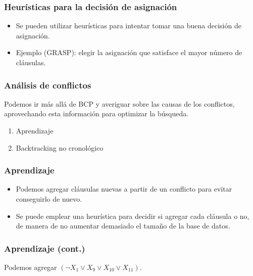 \documentclass{beamer}
\begin{document}
\frame
{
  \frametitle{Heurísticas para la decisión de asignación}

  \begin{itemize}
   \item Se pueden utilizar heurísticas para intentar tomar una buena decisión de asignación.
   \item Ejemplo (GRASP): elegir la asignación que satisface el mayor número de cláusulas.
  \end{itemize}
}

\frame
{
  \frametitle{Análisis de conflictos}

  Podemos ir más allá de BCP y averiguar sobre las causas de los conflictos,
  aprovechando esta información para optimizar la búsqueda.

  \begin{enumerate}
   \item Aprendizaje
   \item Backtracking no cronológico
  \end{enumerate}

}

\frame
{
  \frametitle{Aprendizaje}

   \begin{itemize}
    \item Podemos agregar cláusulas nuevas a partir de un conflicto para evitar conseguirlo de nuevo.
    \item Se puede emplear una heurística para decidir si agregar cada cláusula o no, de manera de no
          aumentar demasiado el tamaño de la base de datos.
   \end{itemize}
}

\frame
{
  \frametitle{Aprendizaje (cont.)}


  Podemos agregar $(\neg X_1 \vee X_9 \vee X_10 \vee X_11)$.
}
\end{document}
